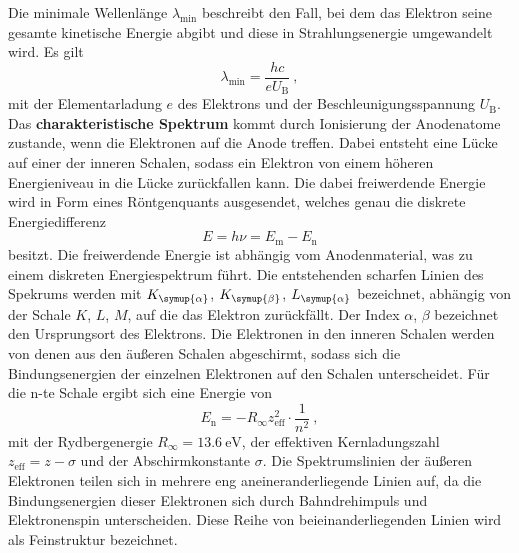     Die minimale Wellenlänge $\lambda_\text{min}$ beschreibt den Fall,
    bei dem das Elektron seine gesamte kinetische Energie abgibt und diese in Strahlungsenergie umgewandelt wird.
    Es gilt
    \begin{equation}
        \lambda_\text{min} = \frac{hc}{eU_\text{B}} \ ,
    \end{equation}
    mit der Elementarladung $e$ des Elektrons und der Beschleunigungsspannung $U_\text{B}$.
    \\
    Das \textbf{charakteristische Spektrum} kommt durch Ionisierung der Anodenatome zustande,
    wenn die Elektronen auf die Anode treffen.
    Dabei entsteht eine Lücke auf einer der inneren Schalen,
    sodass ein Elektron von einem höheren Energieniveau in die Lücke zurückfallen kann.
    Die dabei freiwerdende Energie wird in Form eines Röntgenquants ausgesendet,
    welches genau die diskrete Energiedifferenz 
    \begin{equation*}
        E = h \nu = E_\text{m} - E_\text{n}
    \end{equation*}
    besitzt.
    Die freiwerdende Energie ist abhängig vom Anodenmaterial,
    was zu einem diskreten Energiespektrum führt.
    Die entstehenden scharfen Linien des Spekrums werden mit $K_{\symup{\alpha}}$, $K_{\symup{\beta}}$, $L_{\symup{\alpha}}$ bezeichnet,
    abhängig von der Schale $K$, $L$, $M$, 
    auf die das Elektron zurückfällt.
    Der Index $\alpha$, $\beta$ bezeichnet den Ursprungsort des Elektrons.
    Die Elektronen in den inneren Schalen werden von denen aus den äußeren Schalen abgeschirmt,
    sodass sich die Bindungsenergien der einzelnen Elektronen auf den Schalen unterscheidet.
    Für die n-te Schale ergibt sich eine Energie von
    \begin{equation}
        E_\text{n} = - R_\infty z_{\text{eff}}^2 \cdot \frac{1}{n^2} \ ,
    \end{equation}
    mit der Rydbergenergie $R_\infty = \SI{13.6}{\electronvolt}$,
    der effektiven Kernladungszahl $z_{\text{eff}} = z - \sigma$ und der Abschirmkonstante $\sigma$.
    Die Spektrumslinien der äußeren Elektronen teilen sich in mehrere eng aneineranderliegende Linien auf,
    da die Bindungsenergien dieser Elektronen sich durch Bahndrehimpuls und Elektronenspin unterscheiden.
    Diese Reihe von beieinanderliegenden Linien wird als Feinstruktur bezeichnet.
